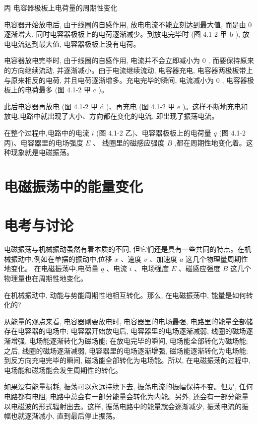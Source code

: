 \documentclass[10pt]{article}
\begin{document}
\begin{mdframed}

丙 电容器极板上电荷量的周期性变化

\end{mdframed}

电容器开始放电后, 由于线圈的自感作用, 放电电流不能立刻达到最大值, 而是由 0 逐渐增大, 同时电容器极板上的电荷逐渐减少。到放电完毕时 (图 4.1-2 甲 b ), 放电电流达到最大值, 电容器极板上没有电荷。

电容器放电完毕时, 由于线圈的自感作用, 电流并不会立即减小为 0 , 而要保持原来的方向继续流动, 并逐渐减小。由于电流继续流动, 电容器充电, 电容器两极板带上与原来相反的电荷, 并且电荷逐渐增多。充电完毕的瞬间, 电流减小为 0 , 电容器极板上的电荷最多 (图 4.1-2 甲 c )。

此后电容器再放电 (图 4.1-2 甲 d )、再充电 (图 4.1-2 甲 \(\mathrm{e}\) )。这样不断地充电和放电,电路中就出现了大小、方向都在变化的电流, 即出现了振荡电流。

在整个过程中,电路中的电流 \(i\) (图 4.1-2 乙)、电容器极板上的电荷量 \(q\) (图 4.1-2 丙)、电容器里的电场强度 \(E\) 、 线圈里的磁感应强度 \(B\) ,都在周期性地变化着。这种现象就是电磁振荡。

\section*{电磁振荡中的能量变化}

\section*{电考与讨论}

电磁振荡与机械振动虽然有着本质的不同, 但它们还是具有一些共同的特点。在机械振动中,例如在单摆的振动中,位移 \(x\) 、速度 \(v\) 、加速度 \(a\) 这几个物理量周期性地变化。 在电磁振荡中,电荷量 \(q\) 、电流 \(i\) 、电场强度 \(E\) 、磁感应强度 \(B\) 这几个物理量也在周期性地变化。

在机械振动中, 动能与势能周期性地相互转化。那么, 在电磁振荡中, 能量是如何转化的?

从能量的观点来看, 电容器刚要放电时, 电容器里的电场最强, 电路里的能量全部储存在电容器的电场中; 电容器开始放电后, 电容器里的电场逐渐减弱, 线圈的磁场逐渐增强, 电场能逐渐转化为磁场能; 在放电完毕的瞬间, 电场能全部转化为磁场能; 之后, 线圈的磁场逐渐减弱, 电容器里的电场逐渐增强, 磁场能逐渐转化为电场能; 到反方向充电完毕的瞬间, 磁场能全部转化为电场能。所以, 在电磁振荡的过程中, 电场能和磁场能会发生周期性的转化。

如果没有能量损耗, 振荡可以永远持续下去, 振荡电流的振幅保持不变。但是, 任何电路都有电阻, 电路中总会有一部分能量会转化为内能。另外, 还会有一部分能量以电磁波的形式辐射出去。这样, 振荡电路中的能量就会逐渐减少, 振荡电流的振幅也就逐渐减小, 直到最后停止振荡。
\end{document}
